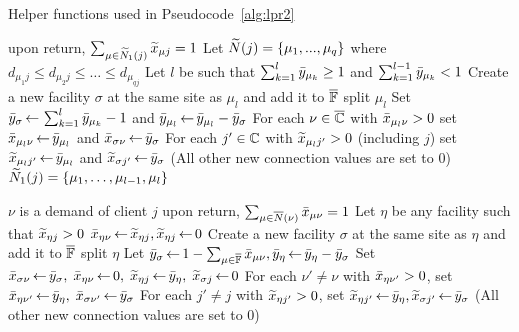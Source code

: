 \documentclass[oneside,final]{ucr}
\begin{document}
\begin{algorithm}[ht]
  \caption{Helper functions used in Pseudocode~\ref{alg:lpr2}}
  \label{alg:helper}
  \begin{algorithmic}[1]
						\Comment upon return, $\sum_{\mu\in{\widetilde N}_1(j)} {\widetilde x}_{\mu j} = 1$
    \State Let ${\widetilde N}(j) = \{\mu_1,...,\mu_{q}\}$ where $d_{\mu_1 j} \leq d_{\mu_2 j} \leq \ldots \leq d_{\mu_{q j}}$
    \State Let $l$ be such that $\sum_{k=1}^{l} {\bar y}_{\mu_k} \geq 1$ and $\sum_{k=1}^{l -1} {\bar y}_{\mu_{k}} < 1$
    \State Create a new facility $\sigma$ at the same site as $\mu_l$ and add it to $\overline{\mathbb{F}}$
			\Comment split $\mu_l$
    \State Set ${\bar y}_{\sigma}{\,\leftarrow\,} \sum_{k=1}^{l} {\bar y}_{\mu_{k}}-1$
					and ${\bar y}_{\mu_l} {\,\leftarrow\,} {\bar y}_{\mu_l} - {\bar y}_{\sigma}$
    \State For each $\nu\in\overline{\mathbb{C}}$ with ${\bar x}_{\mu_{l}\nu}>0$
 			set ${\bar x}_{\mu_{l}\nu} {\,\leftarrow\,} {\bar y}_{\mu_l}$ and ${\bar x}_{\sigma \nu} {\,\leftarrow\,} {\bar y}_{\sigma}$
    \State For each $j'\in\mathbb{C}$ with ${\widetilde x}_{\mu_{l} j'}>0$ (including $j$)
			set ${\widetilde x}_{\mu_l j'} {\,\leftarrow\,} {\bar y}_{\mu_l}$ and ${\widetilde x}_{\sigma j'} {\,\leftarrow\,} {\bar y}_\sigma$
	\State (All other new connection values are set to $0$)
    \State \Return ${\widetilde N}_1(j) = \{\mu_{1},\ldots,\mu_{l-1}, \mu_{l}\}$    				
    \EndFunction

    					\Comment $\nu$ is a demand of client $j$
    					\Comment upon return, $\sum_{\mu\in{\overline{N}}(\nu)} {\bar x}_{\mu\nu} = 1$
    \State Let $\eta$ be any facility such that ${\widetilde x}_{\eta j} > 0$
    \State ${\bar x}_{\eta\nu} {\,\leftarrow\,} {\widetilde x}_{\eta j}, {\widetilde x}_{\eta j} {\,\leftarrow\,} 0$
    \Else
    \State Create a new facility $\sigma$ at the same site as $\eta$ and add it to $\overline{\mathbb{F}}$
    					\Comment split $\eta$
    \State Let ${\bar y}_\sigma {\,\leftarrow\,} 1-\sum_{\mu\in \overline{\mathbb{F}}} {\bar x}_{\mu\nu}, {\bar y}_{\eta} {\,\leftarrow\,} {\bar y}_{\eta} - {\bar y}_{\sigma}$
    \State Set ${\bar x}_{\sigma\nu}{\,\leftarrow\,} {\bar y}_{\sigma},\; {\bar x}_{\eta \nu} {\,\leftarrow\,}  0,\; {\widetilde x}_{\eta j} {\,\leftarrow\,} {\bar y}_{\eta}, \; {\widetilde x}_{\sigma j} {\,\leftarrow\,} 0$
    \State For each $\nu' \neq \nu$ with ${\bar x}_{\eta \nu'}>0$, set ${\bar x}_{\eta \nu'} {\,\leftarrow\,} {\bar y}_{\eta},\; {\bar x}_{\sigma \nu'} {\,\leftarrow\,} {\bar y}_{\sigma}$
    \State For each $j' \neq j$ with ${\widetilde x}_{\eta j'}>0$, set ${\widetilde x}_{\eta j'} {\,\leftarrow\,} {\bar y}_{\eta}, {\widetilde x}_{\sigma j'} {\,\leftarrow\,} {\bar y}_{\sigma}$
	\State  (All other new connection values are set to $0$)
    \EndIf
    \EndWhile
    \EndFunction
  \end{algorithmic}
\end{algorithm}
\end{document}
